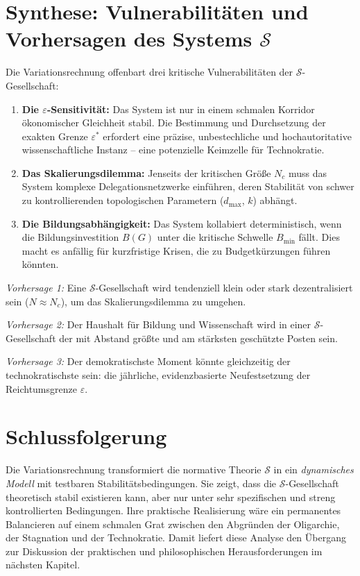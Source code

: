\section{Synthese: Vulnerabilitäten und Vorhersagen des Systems $\mathcal{S}$}

Die Variationsrechnung offenbart drei kritische Vulnerabilitäten der $\mathcal{S}$-Gesellschaft:
\begin{enumerate}
    \item \textbf{Die $\varepsilon$-Sensitivität:} Das System ist nur in einem schmalen Korridor ökonomischer Gleichheit stabil. Die Bestimmung und Durchsetzung der exakten Grenze $\varepsilon^*$ erfordert eine präzise, unbestechliche und hochautoritative wissenschaftliche Instanz -- eine potenzielle Keimzelle für Technokratie.
    \item \textbf{Das Skalierungsdilemma:} Jenseits der kritischen Größe $N_c$ muss das System komplexe Delegationsnetzwerke einführen, deren Stabilität von schwer zu kontrollierenden topologischen Parametern ($d_{\text{max}}$, $k$) abhängt.
    \item \textbf{Die Bildungsabhängigkeit:} Das System kollabiert deterministisch, wenn die Bildungsinvestition $B(G)$ unter die kritische Schwelle $B_{\min}$ fällt. Dies macht es anfällig für kurzfristige Krisen, die zu Budgetkürzungen führen könnten.
\end{enumerate}

\emph{Vorhersage 1:} Eine $\mathcal{S}$-Gesellschaft wird tendenziell klein oder stark dezentralisiert sein ($N \approx N_c$), um das Skalierungsdilemma zu umgehen.

\emph{Vorhersage 2:} Der Haushalt für Bildung und Wissenschaft wird in einer $\mathcal{S}$-Gesellschaft der mit Abstand größte und am stärksten geschützte Posten sein.

\emph{Vorhersage 3:} Der demokratischste Moment könnte gleichzeitig der technokratischste sein: die jährliche, evidenzbasierte Neufestsetzung der Reichtumsgrenze $\varepsilon$.

\section{Schlussfolgerung}
Die Variationsrechnung transformiert die normative Theorie $\mathcal{S}$ in ein \emph{dynamisches Modell} mit testbaren Stabilitätsbedingungen. Sie zeigt, dass die $\mathcal{S}$-Gesellschaft theoretisch stabil existieren kann, aber nur unter sehr spezifischen und streng kontrollierten Bedingungen. Ihre praktische Realisierung wäre ein permanentes Balancieren auf einem schmalen Grat zwischen den Abgründen der Oligarchie, der Stagnation und der Technokratie. Damit liefert diese Analyse den Übergang zur Diskussion der praktischen und philosophischen Herausforderungen im nächsten Kapitel.
